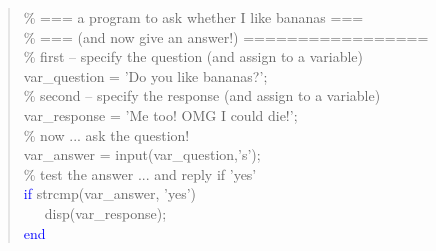 \documentclass{tufte-book} %
\newenvironment{docspec}{\begin{quotation}\ttfamily\parskip0pt\parindent0pt\ignorespaces}{\end{quotation}}
\begin{document}
\begin{docspec}
\textcolor[rgb]{0,0.501961,0}{\% === a program to ask whether I like bananas ===
\\\% === (and now give an answer!) =================
\\\% first -- specify the question (and assign to a variable)}
\\var\_question = \textcolor[rgb]{1,0,1}{'Do you like bananas?'};
\textcolor[rgb]{0,0.501961,0}{\\\% second -- specify the response (and assign to a variable)}
\\var\_response = \textcolor[rgb]{1,0,1}{'Me too! OMG I could die!'};
\textcolor[rgb]{0,0.501961,0}{\\\% now ... ask the question!}
\\var\_answer = input(var\_question,\textcolor[rgb]{1,0,1}{'s'});
\textcolor[rgb]{0,0.501961,0}{\\\% test the answer ... and reply if 'yes'}
\\\textcolor{blue}{if} strcmp(var\_answer, \textcolor[rgb]{1,0,1}{'yes'})
\\ \ \ \ disp(var\_response);
\\\textcolor{blue}{end}
\end{docspec}
\end{document}
